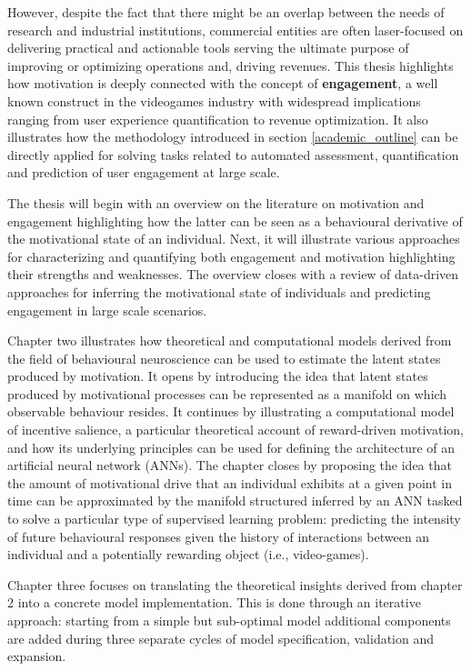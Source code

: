 However, despite the fact that there might be an overlap between the needs of research and industrial institutions, commercial entities are often laser-focused on delivering practical and actionable tools serving the ultimate purpose of improving or optimizing operations and, driving revenues. This thesis highlights how motivation is deeply connected with the concept of \textbf{engagement}, a well known construct in the videogames industry with widespread implications ranging from user experience quantification to revenue optimization. It also illustrates how the methodology introduced in section \ref{academic_outline} can be directly applied for solving tasks related to automated assessment, quantification and prediction of user engagement at large scale.

The thesis will begin with an overview on the literature on motivation and engagement highlighting how the latter can be seen as a behavioural derivative of the motivational state of an individual. Next, it will illustrate various approaches for characterizing and quantifying both engagement and motivation highlighting their strengths and weaknesses. The overview closes with a review of data-driven approaches for inferring the motivational state of individuals and predicting engagement in large scale scenarios. 

Chapter two illustrates how theoretical and computational models derived from the field of behavioural neuroscience can be used to estimate the latent states produced by motivation. It opens by introducing the idea that latent states produced by motivational processes can be represented as a manifold on which observable behaviour resides. It continues by illustrating a computational model of incentive salience, a particular theoretical account of reward-driven motivation, and how its underlying principles can be used for defining the architecture of an artificial neural network (ANNs). The chapter closes by proposing the idea that the amount of motivational drive that an individual exhibits at a given point in time can be approximated by the manifold structured inferred by an ANN tasked to solve a particular type of supervised learning problem: predicting the intensity of future behavioural responses given the history of interactions between an individual and a potentially rewarding object (i.e., video-games). 

Chapter three focuses on translating the theoretical insights derived from chapter 2 into a concrete model implementation. This is done through an iterative approach: starting from a simple but sub-optimal model additional components are added during three separate cycles of model specification, validation and expansion. 

